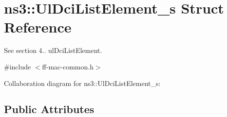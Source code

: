 \hypertarget{structns3_1_1UlDciListElement__s}{}\section{ns3\+:\+:Ul\+Dci\+List\+Element\+\_\+s Struct Reference}
\label{structns3_1_1UlDciListElement__s}


See section 4.. ul\+Dci\+List\+Element.  




{\ttfamily \#include $<$ff-\/mac-\/common.\+h$>$}



Collaboration diagram for ns3\+:\+:Ul\+Dci\+List\+Element\+\_\+s\+:
\subsection*{Public Attributes}
